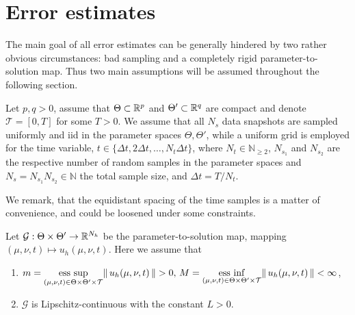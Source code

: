 \section{Error estimates} \label{section: Error estimates}


The main goal of all error estimates can be generally hindered by two rather obvious circumstances: bad sampling and a completely rigid parameter-to-solution map. Thus two main assumptions will be assumed throughout the following section.

\begin{assumption} \label{assumption sample}
    Let $p,q > 0$, assume that $\Theta \subset \mathbb{R}^p$ and $\Theta' \subset \mathbb{R}^q$ are compact and denote $\mathcal{T} = [0, T]$ for some $T > 0$. We assume that all $N_s$ data snapshots are sampled uniformly and iid in the parameter spaces $\Theta, \Theta'$, while a uniform grid is employed for the time variable, $t \in \{\Delta t, 2 \Delta t, \dots, N_t \Delta t \}$, where $N_t \in \mathbb{N}_{\geq 2}$, $N_{s_1}$ and $N_{s_2}$ are the respective number of random samples in the parameter spaces and $N_s = N_{s_1} N_{s_2} \in \mathbb{N}$ the total sample size, and $\Delta t = T / N_t$.
\end{assumption}

We remark, that the equidistant spacing of the time samples is a matter of convenience, and could be loosened under some constraints.

\begin{assumption} \label{assumption parameter-to-solution map}
    Let $\mathcal{G}: \Theta \times \Theta' \to \mathbb{R}^{N_h}$ be the parameter-to-solution map, mapping $(\mu, \nu, t) \mapsto u_h(\mu, \nu, t)$. Here we assume that
    \begin{enumerate}
        \item $m = 
        \underset{(\mu, \nu, t) \in \Theta \times \Theta' \times \mathcal{T}}{\operatorname{ess}\, \sup}\lVert \, u_h(\mu, \nu, t) \, \rVert > 0, \, M = 
        \underset{(\mu, \nu, t) \in \Theta \times \Theta' \times \mathcal{T}}{\operatorname{ess}\, \inf}\lVert \, u_h(\mu, \nu, t) \, \rVert < \infty$,
        \item $\mathcal{G}$ is Lipschitz-continuous with the constant $L > 0$.
    \end{enumerate}
\end{assumption}

